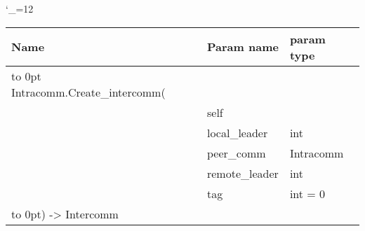 \begingroup \catcode`\_=12 \tt
\begin{tabular}{lll}
\toprule
\textrm{Name}&\textrm{Param name}&\textrm{param type}\\
\midrule
\hbox to 0pt {Intracomm.Create_intercomm(\hss}\\
& self\\
& local_leader & int\\
& peer_comm & Intracomm\\
& remote_leader & int\\
& tag & int = 0\\
\hbox to 0pt{) -> Intercomm\hss}\\
\bottomrule
\end{tabular}
\endgroup
